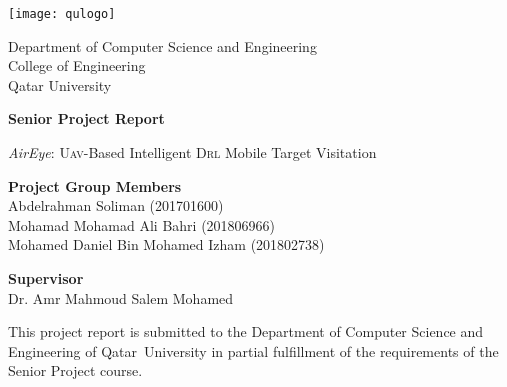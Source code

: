 \documentclass[../main.tex]{subfiles}
\begin{document}
        \thispagestyle{empty}

        \centering
        \texttt{[image: qulogo]}

        \Large
        Department of Computer Science and Engineering\\
        College of Engineering\\
        Qatar University\\

        \vspace{2.5cm}

        \Huge
        \textbf{Senior Project Report}

        \vspace{1.1cm}
        \Large
        \emph{AirEye}: \textsc{Uav}-Based Intelligent \textsc{Drl} Mobile Target Visitation

        \vspace{3.3cm}

        \raggedright
        \large
        \-\hspace{0.8cm} \textbf{Project Group Members}\\
        \normalsize
        \medskip
        \-\hspace{1.3cm} Abdelrahman Soliman (201701600)\\
        \-\hspace{1.3cm} Mohamad Mohamad Ali Bahri (201806966)\\
        \-\hspace{1.3cm} Mohamed Daniel Bin Mohamed Izham (201802738)\\

        \vspace{1.0cm}

        \large
        \-\hspace{0.8cm} \textbf{Supervisor}\\
        \normalsize
        \medskip
        \-\hspace{1.3cm} Dr. Amr Mahmoud Salem Mohamed\\

        \vfill

        \small

        This project report is submitted to the Department
        of Computer Science and Engineering of Qatar~University 
        in partial fulfillment of the
        requirements of the Senior Project course.

        \vspace{0.8cm}
\end{document}
